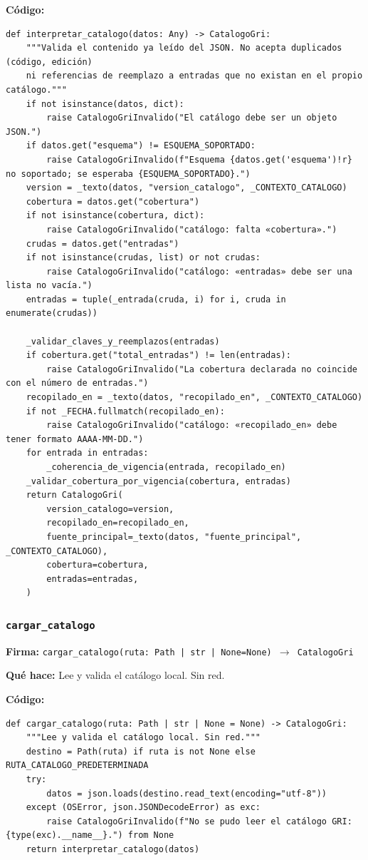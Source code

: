 \documentclass[11pt,a4paper]{article}
\begin{document}
\textbf{Código:}
\begin{lstlisting}
def interpretar_catalogo(datos: Any) -> CatalogoGri:
    """Valida el contenido ya leído del JSON. No acepta duplicados (código, edición)
    ni referencias de reemplazo a entradas que no existan en el propio catálogo."""
    if not isinstance(datos, dict):
        raise CatalogoGriInvalido("El catálogo debe ser un objeto JSON.")
    if datos.get("esquema") != ESQUEMA_SOPORTADO:
        raise CatalogoGriInvalido(f"Esquema {datos.get('esquema')!r} no soportado; se esperaba {ESQUEMA_SOPORTADO}.")
    version = _texto(datos, "version_catalogo", _CONTEXTO_CATALOGO)
    cobertura = datos.get("cobertura")
    if not isinstance(cobertura, dict):
        raise CatalogoGriInvalido("catálogo: falta «cobertura».")
    crudas = datos.get("entradas")
    if not isinstance(crudas, list) or not crudas:
        raise CatalogoGriInvalido("catálogo: «entradas» debe ser una lista no vacía.")
    entradas = tuple(_entrada(cruda, i) for i, cruda in enumerate(crudas))

    _validar_claves_y_reemplazos(entradas)
    if cobertura.get("total_entradas") != len(entradas):
        raise CatalogoGriInvalido("La cobertura declarada no coincide con el número de entradas.")
    recopilado_en = _texto(datos, "recopilado_en", _CONTEXTO_CATALOGO)
    if not _FECHA.fullmatch(recopilado_en):
        raise CatalogoGriInvalido("catálogo: «recopilado_en» debe tener formato AAAA-MM-DD.")
    for entrada in entradas:
        _coherencia_de_vigencia(entrada, recopilado_en)
    _validar_cobertura_por_vigencia(cobertura, entradas)
    return CatalogoGri(
        version_catalogo=version,
        recopilado_en=recopilado_en,
        fuente_principal=_texto(datos, "fuente_principal", _CONTEXTO_CATALOGO),
        cobertura=cobertura,
        entradas=entradas,
    )
\end{lstlisting}

\subsubsection*{\texttt{cargar\_catalogo}}
\textbf{Firma:} \texttt{cargar\_catalogo(ruta: Path | str | None=None) $\rightarrow$ CatalogoGri}

\textbf{Qué hace:} Lee y valida el catálogo local. Sin red.

\textbf{Código:}
\begin{lstlisting}
def cargar_catalogo(ruta: Path | str | None = None) -> CatalogoGri:
    """Lee y valida el catálogo local. Sin red."""
    destino = Path(ruta) if ruta is not None else RUTA_CATALOGO_PREDETERMINADA
    try:
        datos = json.loads(destino.read_text(encoding="utf-8"))
    except (OSError, json.JSONDecodeError) as exc:
        raise CatalogoGriInvalido(f"No se pudo leer el catálogo GRI: {type(exc).__name__}.") from None
    return interpretar_catalogo(datos)
\end{lstlisting}
\end{document}
